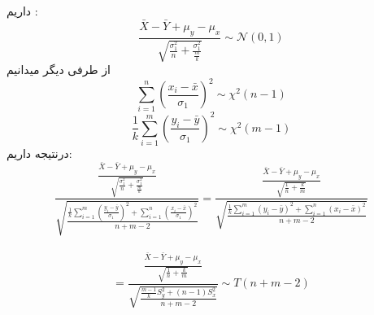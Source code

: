 \problem{}
داریم :\\
\[
    \frac{\bar{X} -\bar{Y} +\mu_y -\mu_x }{\sqrt{\frac{\sigma_1^2}{n}+\frac{\sigma_1^2}{\frac{m}{k}}}}\sim \mathcal{N}(0,1)
\]
از طرفی دیگر میدانیم
\[ \sum_{i=1}^{n}{(\frac{x_i-\bar{x}}{\sigma_1})^2} \sim \chi^2 (n-1)\]
\[ \frac{1}{k}\sum_{i=1}^{m}{(\frac{y_i-\bar{y}}{\sigma_1})^2} \sim \chi^2 (m-1)\]
درنتیجه داریم:\\
\[
    \frac{\frac{\bar{X} -\bar{Y} +\mu_y -\mu_x }{\sqrt{\frac{\sigma_1^2}{n}+\frac{\sigma_1^2}{\frac{m}{k}}}}}
    {\sqrt{\frac{\frac{1}{k}\sum_{i=1}^{m}{(\frac{y_i-\bar{y}}{\sigma_1})^2}+\sum_{i=1}^{n}{(\frac{x_i-\bar{x}}{\sigma_1})^2}}{n+m-2}}} 
    =  
    \frac{\frac{\bar{X} -\bar{Y} +\mu_y -\mu_x }{\sqrt{\frac{1}{n}+\frac{k}{m}}}}
    {\sqrt{\frac{\frac{1}{k}\sum_{i=1}^{m}{({y_i-\bar{y}})^2}+\sum_{i=1}^{n}{({x_i-\bar{x}})^2}}{n+m-2}}}   
\]\\
\[
    = 
    \frac{\frac{\bar{X} -\bar{Y} +\mu_y -\mu_x }{\sqrt{\frac{1}{n}+\frac{k}{m}}}}
    {\sqrt{\frac{\frac{m-1}{k}S^2_y + (n-1)S^2_x}{n+m-2}}}  
    \sim T(n+m-2) 
\]